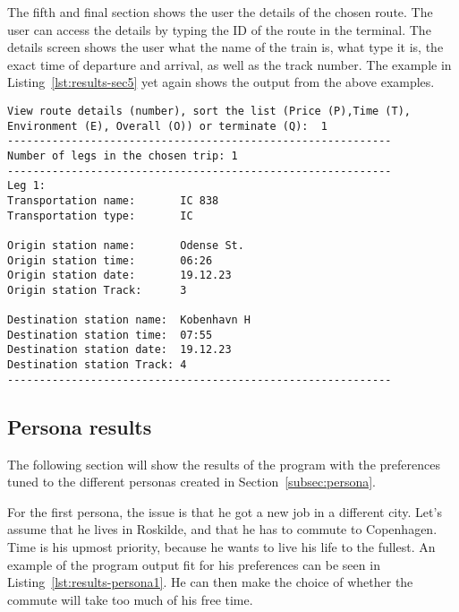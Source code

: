 The fifth and final section shows the user the details of the chosen route.
The user can access the details by typing the ID of the route in the terminal.
The details screen shows the user what the name of the train is, what type it is, the exact time of departure and
arrival, as well as the track number.
The example in Listing~\ref{lst:results-sec5} yet again shows the output from the above examples.

\begin{lstlisting}[label={lst:results-sec5}, caption={Route details output.}, captionpos=b, language={}]
View route details (number), sort the list (Price (P),Time (T), Environment (E), Overall (O)) or terminate (Q):  1
------------------------------------------------------------
Number of legs in the chosen trip: 1
------------------------------------------------------------
Leg 1:
Transportation name:       IC 838
Transportation type:       IC

Origin station name:       Odense St.
Origin station time:       06:26
Origin station date:       19.12.23
Origin station Track:      3

Destination station name:  Kobenhavn H
Destination station time:  07:55
Destination station date:  19.12.23
Destination station Track: 4
------------------------------------------------------------
\end{lstlisting}


\subsection{Persona results}\label{subsec:persona-results}

The following section will show the results of the program with the preferences tuned to the different personas created
in Section~\ref{subsec:persona}.

For the first persona, the issue is that he got a new job in a different city.
Let's assume that he lives in Roskilde, and that he has to commute to Copenhagen.
Time is his upmost priority, because he wants to live his life to the fullest.
An example of the program output fit for his preferences can be seen in Listing~\ref{lst:results-persona1}.
He can then make the choice of whether the commute will take too much of his free time.

